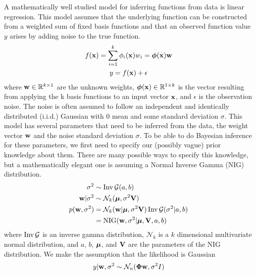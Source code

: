 \documentclass[../thesis.tex]{subfiles}
\begin{document}
A mathematically well studied model for inferring functions from data is linear regression. This model assumes that the underlying function can be constructed from a weighted sum of fixed basis functions and that an observed function value $y$ arises by adding noise to the true function.
\begin{gather}
        f(\boldsymbol{\mathbf{x}}) = \sum_{i=1}^k \phi_i(\boldsymbol{\mathbf{x}}) w_i = \boldsymbol{\mathbf{\phi}}(\boldsymbol{\mathbf{x}}) \boldsymbol{\mathbf{w}} \\
        y = f(\boldsymbol{\mathbf{x}}) + \epsilon
\end{gather}
where $\boldsymbol{\mathbf{w}} \in \mathbb{R}^{k \times 1}$ are the unknown weights, $\boldsymbol{\mathbf{\phi}}(\boldsymbol{\mathbf{x}}) \in \mathbb{R}^{1 \times k}$ is the vector resulting from applying the k basis functions to an input vector $\boldsymbol{\mathbf{x}}$,  and $\epsilon$ is the observation noise. The noise is often assumed to follow an independent and identically distributed (i.i.d.) Gaussian with $0$ mean and some standard deviation $\sigma$. This model has several parameters that need to be inferred from the data, the weight vector $\boldsymbol{\mathbf{w}}$ and the noise standard deviation $\sigma$. To be able to do Bayesian inference for these parameters, we first need to specify our (possibly vague) prior knowledge about them. There are many possible ways to specify this knowledge, but a mathematically elegant one is assuming a Normal Inverse Gamma (NIG) distribution. 
\begin{equation}
    \begin{split}
        \sigma^2 &\sim \operatorname{Inv}\mathcal{G}(a, b) \\  
        \boldsymbol{\mathbf{w}} | \sigma^2 &\sim \mathcal{N}_k(\boldsymbol{\mathbf{\mu}}, \sigma^2 \boldsymbol{\mathbf{V}}) \\
        p(\boldsymbol{\mathbf{w}}, \sigma^2) &= \mathcal{N}_k(\boldsymbol{\mathbf{w}} | \boldsymbol{\mathbf{\mu}}, \sigma^2 \boldsymbol{\mathbf{V}})  \operatorname{Inv}\mathcal{G}(\sigma^2 | a, b) \\
        &= \operatorname{NIG}(\boldsymbol{\mathbf{w}}, \sigma^2 | \boldsymbol{\mathbf{\mu}}, \boldsymbol{\mathbf{V}}, a, b) \\
    \end{split}
\end{equation}
where $\operatorname{Inv}\mathcal{G}$ is an inverse gamma distribution, $\mathcal{N}_k$ is a $k$ dimensional multivariate normal distribution, and $a$, $b$, $\boldsymbol{\mathbf{\mu}}$, and $\boldsymbol{\mathbf{V}}$ are the parameters of the NIG distribution. We make the assumption that the likelihood is Gaussian
\begin{equation}
    \begin{split}
        y | \boldsymbol{\mathbf{w}}, \sigma^2  \sim  \mathcal{N}_n (\boldsymbol{\mathbf{\Phi}} \boldsymbol{\mathbf{w}}, \sigma^2 I) 
    \end{split}
\end{equation}
\end{document}
